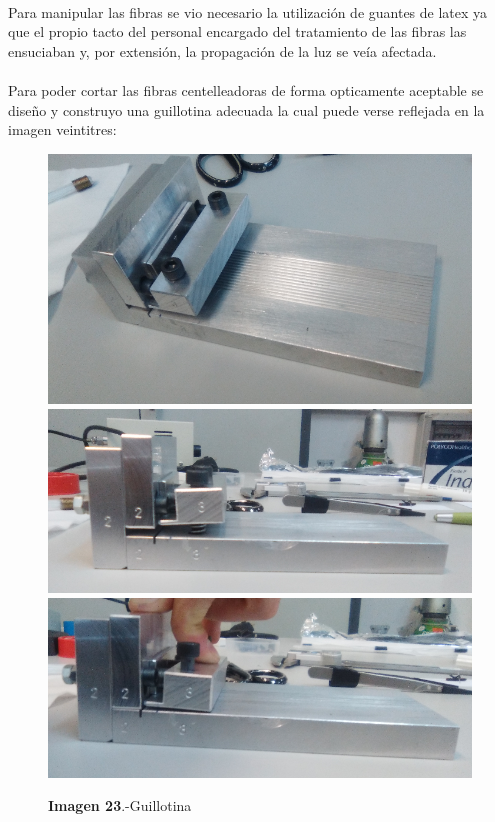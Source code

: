 \paragraph {}
Para manipular las fibras se vio necesario la utilización de guantes de latex ya que el propio tacto  del personal encargado del tratamiento de las fibras las ensuciaban y, por extensión, la propagación de la luz se veía afectada.

\paragraph {}
Para poder cortar las fibras centelleadoras de forma opticamente aceptable se diseño y construyo una guillotina adecuada la cual puede verse reflejada en la imagen veintitres:

\begin{figure}[htb]
\centering
{
\includegraphics[scale=0.2]{Guillotina1.png} 
}
{
\includegraphics[scale=0.2]{Guillotina2.png} 
}
{
\includegraphics[scale=0.2]{Guillotina3.png} 
}
\caption{\textbf{Imagen 23}.-Guillotina}
\end{figure} 

